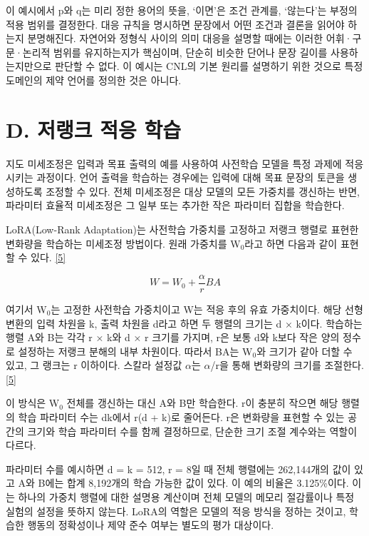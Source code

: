 \documentclass[11pt,a4paper]{article}
\begin{document}
이 예시에서 p와 q는 미리 정한 용어의 뜻을, ‘이면’은 조건 관계를, ‘않는다’는 부정의 적용 범위를 결정한다. 대응 규칙을 명시하면 문장에서 어떤 조건과 결론을 읽어야 하는지 분명해진다. 자연어와 정형식 사이의 의미 대응을 설명할 때에는 이러한 어휘·구문·논리적 범위를 유지하는지가 핵심이며, 단순히 비슷한 단어나 문장 길이를 사용하는지만으로 판단할 수 없다. 이 예시는 CNL의 기본 원리를 설명하기 위한 것으로 특정 도메인의 제약 언어를 정의한 것은 아니다.\par

\section*{D. 저랭크 적응 학습}

지도 미세조정은 입력과 목표 출력의 예를 사용하여 사전학습 모델을 특정 과제에 적응시키는 과정이다. 언어 출력을 학습하는 경우에는 입력에 대해 목표 문장의 토큰을 생성하도록 조정할 수 있다. 전체 미세조정은 대상 모델의 모든 가중치를 갱신하는 반면, 파라미터 효율적 미세조정은 그 일부 또는 추가한 작은 파라미터 집합을 학습한다.\par

LoRA(Low-Rank Adaptation)는 사전학습 가중치를 고정하고 저랭크 행렬로 표현한 변화량을 학습하는 미세조정 방법이다. 원래 가중치를 W\ensuremath{{}_0}라고 하면 다음과 같이 표현할 수 있다. \href{\detokenize{https://arxiv.org/abs/2106.09685}}{[5]}\par

\[W = W_0 + \frac{\alpha}{r}BA\]

여기서 W\ensuremath{{}_0}는 고정한 사전학습 가중치이고 W는 적응 후의 유효 가중치이다. 해당 선형 변환의 입력 차원을 k, 출력 차원을 d라고 하면 두 행렬의 크기는 d × k이다. 학습하는 행렬 A와 B는 각각 r × k와 d × r 크기를 가지며, r은 보통 d와 k보다 작은 양의 정수로 설정하는 저랭크 분해의 내부 차원이다. 따라서 BA는 W\ensuremath{{}_0}와 크기가 같아 더할 수 있고, 그 랭크는 r 이하이다. 스칼라 설정값 \ensuremath{\alpha}는 \ensuremath{\alpha}/r을 통해 변화량의 크기를 조절한다. \href{\detokenize{https://arxiv.org/abs/2106.09685}}{[5]}\par

이 방식은 W\ensuremath{{}_0} 전체를 갱신하는 대신 A와 B만 학습한다. r이 충분히 작으면 해당 행렬의 학습 파라미터 수는 dk에서 r(d + k)로 줄어든다. r은 변화량을 표현할 수 있는 공간의 크기와 학습 파라미터 수를 함께 결정하므로, 단순한 크기 조절 계수와는 역할이 다르다.\par

파라미터 수를 예시하면 d = k = 512, r = 8일 때 전체 행렬에는 262,144개의 값이 있고 A와 B에는 합계 8,192개의 학습 가능한 값이 있다. 이 예의 비율은 3.125\%이다. 이는 하나의 가중치 행렬에 대한 설명용 계산이며 전체 모델의 메모리 절감률이나 특정 실험의 설정을 뜻하지 않는다. LoRA의 역할은 모델의 적응 방식을 정하는 것이고, 학습한 행동의 정확성이나 제약 준수 여부는 별도의 평가 대상이다.\par
\end{document}
